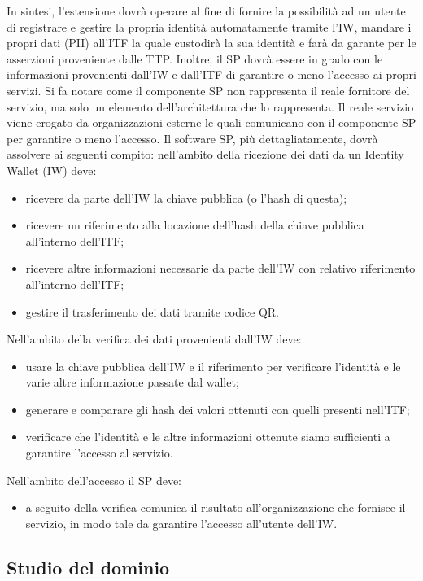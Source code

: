 In sintesi, l’estensione dovrà operare al fine di fornire la possibilità ad un utente di registrare e gestire la propria identità automatamente tramite l’IW, mandare i propri dati (PII) all’ITF la quale custodirà la sua identità e farà da garante per le asserzioni proveniente dalle TTP. Inoltre, il SP dovrà essere in grado con le informazioni provenienti dall’IW e dall’ITF di garantire o meno l’accesso ai propri servizi. Si fa notare come il componente SP non rappresenta il reale fornitore del servizio, ma solo un elemento dell’architettura che lo rappresenta. Il reale servizio viene erogato da organizzazioni esterne le quali comunicano con il componente SP per garantire o meno l’accesso.
Il software SP, più dettagliatamente, dovrà assolvere ai seguenti compito:
nell’ambito della ricezione dei dati da un Identity Wallet (IW) deve:
\begin{itemize}
    \item ricevere da parte dell’IW la chiave pubblica (o l’hash di questa);
    \item ricevere un riferimento alla locazione dell’hash della chiave pubblica all’interno dell’ITF;
    \item ricevere altre informazioni necessarie da parte dell’IW con relativo riferimento all’interno dell’ITF;
    \item gestire il trasferimento dei dati tramite codice QR.
\end{itemize}
Nell’ambito della verifica dei dati provenienti dall’IW deve:
\begin{itemize}
    \item usare la chiave pubblica dell’IW e il riferimento per verificare l’identità e le varie altre informazione passate dal wallet;
    \item generare e comparare gli hash dei valori ottenuti con quelli presenti nell’ITF;
    \item verificare che l’identità e le altre informazioni ottenute siamo sufficienti a garantire l’accesso al servizio.
\end{itemize}
Nell’ambito dell’accesso il SP deve:
\begin{itemize}
    \item a seguito della verifica comunica il risultato all’organizzazione che fornisce il servizio, in modo tale da garantire l’accesso all’utente dell’IW.
\end{itemize}

\subsection{Studio del dominio}
